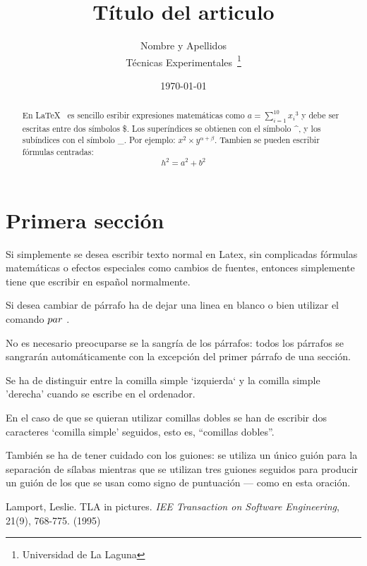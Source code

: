 \documentclass[a4paper,12pt]{article}
\begin{document}
\title{Título del articulo}
\author{Nombre y Apellidos\\
	Técnicas Experimentales~\footnote{Universidad de La Laguna}
	}
\date{\today}
\maketitle

\begin{abstract}
  En \LaTeX{}~\cite{Lam:86} es sencillo esribir expresiones
  matemáticas como $a=\sum_{i=1}^{10} {x_i}^{3}$
  y debe ser escritas entre dos símbolos \$.
  Los superíndices se obtienen con el símbolo \^{}, y
  los subíndices con el símbolo \_.
  Por ejemplo: $x^2 \times y^{\alpha + \beta}$.
  Tambien se pueden escribir fórmulas centradas:
  \[h^2=a^2 + b^2 \]
\end{abstract}

\section{Primera sección}
Si simplemente se desea escribir texto normal en Latex,
sin complicadas f\'ormulas matem\'aticas o efectos especiales
como cambios de fuentes, entonces simplemente tiene que escribir
en espa\~nol normalmente.\par
Si desea cambiar de párrafo ha de dejar una linea en blanco o bien
utilizar el comando $\\par$ .

No es necesario preocuparse se la sangría de los párrafos:
todos los párrafos se sangrarán automáticamente con la excepción
del primer párrafo de una sección.

Se ha de distinguir entre la comilla simple `izquierda`
y la comilla simple 'derecha' cuando se escribe en el ordenador.

En el caso de que se quieran utilizar comillas dobles se han de 
escribir dos caracteres `comilla simple' seguidos, esto es, 
``comillas dobles''.

También se ha de tener cuidado con los guiones: se utiliza un único
guión para la separación de sílabas mientras que se utilizan
tres guiones seguidos para producir un guión de los que se usan
como signo de puntuación --- como en esta oración.

\begin{thebibliography}{00}
    Lamport, Leslie.
    TLA in pictures.
    \emph{IEE Transaction on Software Engineering},
    21(9), 768-775.
    (1995)
\end{thebibliography}   
\end{document}
